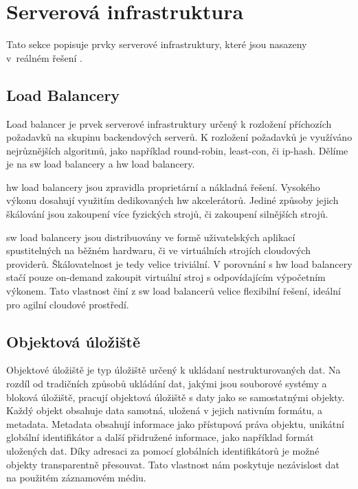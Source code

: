 \section{Serverová infrastruktura}
\label{sub:server-architecture}

Tato sekce popisuje prvky serverové infrastruktury, které jsou nasazeny v~reálném řešení \bso. 

\label{sub:load-balancing}
\subsection{Load Balancery}

Load balancer\cite{load-balancer} je prvek serverové infrastruktury určený k rozložení příchozích požadavků na skupinu backendových serverů. K rozložení požadavků je využíváno nejrůznějších algoritmů, jako například \gls{round-robin}, \gls{least-con}, či \gls{ip-hash}. Dělíme je na \acrshort{sw} load balancery a \acrshort{hw} load balancery. 

\acrshort{hw} load balancery jsou zpravidla proprietární a nákladná řešení. Vysokého výkonu dosahují využitím dedikovaných \acrshort{hw} akcelerátorů. Jediné způsoby jejich škálování jsou zakoupení více fyzických strojů, či zakoupení silnějších strojů.

\acrshort{sw} load balancery jsou distribuovány ve formě uživatelských aplikací spustitelných na běžném hardwaru, či ve virtuálních strojích cloudových providerů. Škálovatelnost je tedy velice triviální. V porovnání s \acrshort{hw} load balancery stačí pouze \gls{on-demand} zakoupit virtuální stroj s odpovídajícím výpočetním výkonem.  Tato vlastnost činí z \acrshort{sw} load balancerů velice flexibilní řešení, ideální pro agilní cloudové prostředí.

\subsection{Objektová úložiště}

Objektové úložiště je typ úložiště určený k ukládaní nestrukturovaných dat. Na rozdíl od tradičních způsobů ukládání dat, jakými jsou souborové systémy a bloková úložiště, pracují objektová úložiště\cite{object-storage} s daty jako se samostatnými objekty. Každý objekt obsahuje data samotná, uložená v jejich nativním formátu, a metadata. Metadata obsahují informace jako přístupová práva objektu, unikátní globální identifikátor a další přidružené informace, jako například formát uložených dat. Díky adresaci za pomocí globálních identifikátorů je možné objekty transparentně přesouvat. Tato vlastnost nám poskytuje nezávislost dat na použitém záznamovém médiu.

